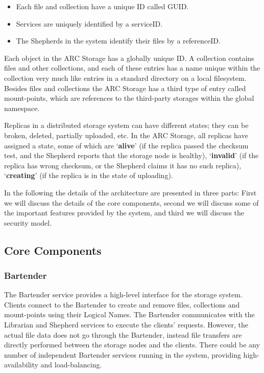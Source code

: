 \documentclass[final]{ieee}
\begin{document}
\begin{itemize} 
\item Each  file and collection have a unique ID called GUID.
\item Services are uniquely identified by a serviceID. 
\item The Shepherds in the system identify their files by a referenceID.
\end{itemize} 

Each object in the ARC Storage has a globally
unique ID. A collection contains files and other collections,
and each of these entries has a name unique within the collection very
much like entries in a standard directory on a local filesystem. Besides
files and collections the ARC Storage has a third type of entry
called mount-points, which are references to the third-party storages
within the global namespace.

Replicas in a distributed storage system can have different states;
they can be broken, deleted, partially uploaded, etc. In the
ARC Storage, all replicas have assigned a state, some of which are
`\textbf{alive}' (if the replica passed the checksum test, and the
Shepherd reports that the storage node is healthy), `\textbf{invalid}'
(if the replica has wrong checksum, or the Shepherd claims it has no
such replica), `\textbf{creating}' (if the replica is in
the state of uploading).

In the following the details of the
architecture are presented in three parts: First we will discuss the
details of the core components, second we will discuss some of the
important features provided by the system, and third we will discuss the security model.

\subsection{Core Components} 
\subsubsection{Bartender}
\label{Bartender}
The Bartender service provides a high-level interface for the storage
system. Clients connect to the Bartender to create and remove
files, collections and mount-points using their Logical Names. The
Bartender communicates 
with the Librarian and Shepherd services to execute the clients'
requests. However, the actual file data does not go through the
Bartender, instead file
transfers are directly performed between the storage nodes and the
clients. There could be any number of independent Bartender services
running in the system, providing high-availability and
load-balancing. 
\end{document}
